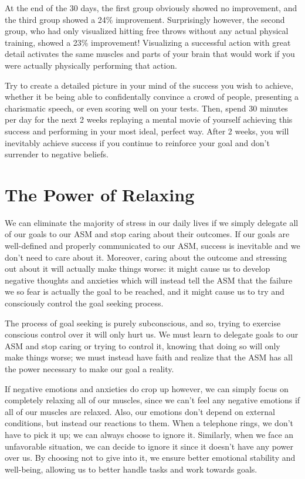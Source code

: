 \documentclass[
]{book}
\begin{document}
At the end of the 30 days, the first group obviously showed no improvement, and the third group showed a 24\% improvement. Surprisingly however, the second group, who had only visualized hitting free throws without any actual physical training, showed a 23\% improvement! Visualizing a successful action with great detail activates the same muscles and parts of your brain that would work if you were actually physically performing that action.

Try to create a detailed picture in your mind of the success you wish to achieve, whether it be being able to confidentally convince a crowd of people, presenting a charismatic speech, or even scoring well on your tests. Then, spend 30 minutes per day for the next 2 weeks replaying a mental movie of yourself achieving this success and performing in your most ideal, perfect way. After 2 weeks, you will inevitably achieve success if you continue to reinforce your goal and don't surrender to negative beliefs.

\hypertarget{the-power-of-relaxing}{%
\section{The Power of Relaxing}\label{the-power-of-relaxing}}

We can eliminate the majority of stress in our daily lives if we simply delegate all of our goals to our ASM and stop caring about their outcomes. If our goals are well-defined and properly communicated to our ASM, success is inevitable and we don't need to care about it. Moreover, caring about the outcome and stressing out about it will actually make things worse: it might cause us to develop negative thoughts and anxieties which will instead tell the ASM that the failure we so fear is actually the goal to be reached, and it might cause us to try and consciously control the goal seeking process.

The process of goal seeking is purely subconscious, and so, trying to exercise conscious control over it will only hurt us. We must learn to delegate goals to our ASM and stop caring or trying to control it, knowing that doing so will only make things worse; we must instead have faith and realize that the ASM has all the power necessary to make our goal a reality.

If negative emotions and anxieties do crop up however, we can simply focus on completely relaxing all of our muscles, since we can't feel any negative emotions if all of our muscles are relaxed. Also, our emotions don't depend on external conditions, but instead our reactions to them. When a telephone rings, we don't have to pick it up; we can always choose to ignore it. Similarly, when we face an unfavorable situation, we can decide to ignore it since it doesn't have any power over us. By choosing not to give into it, we ensure better emotional stability and well-being, allowing us to better handle tasks and work towards goals.
\end{document}
